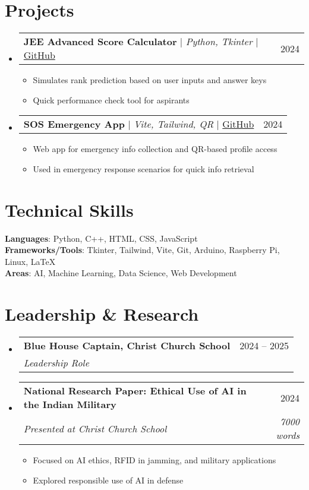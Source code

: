 \documentclass[letterpaper,11pt]{article}
\makeatletter
\newcommand{\resumeItem}[1]{
  \item\small{
    {#1 \vspace{-2pt}}
  }
}
\newcommand{\resumeSubheading}[4]{
  \vspace{-2pt}\item
    \begin{tabular*}{0.97\textwidth}[t]{l@{\extracolsep{\fill}}r}
      \textbf{#1} & #2 \\
      \textit{\small#3} & \textit{\small #4} \\
    \end{tabular*}\vspace{-7pt}
}
\newcommand{\resumeProjectHeading}[2]{
    \item
    \begin{tabular*}{0.97\textwidth}{l@{\extracolsep{\fill}}r}
      \small#1 & #2 \\
    \end{tabular*}\vspace{-7pt}
}
\newcommand{\resumeSubHeadingListStart}{\begin{itemize}[leftmargin=0.15in, label={}]}
\newcommand{\resumeSubHeadingListEnd}{\end{itemize}}
\newcommand{\resumeItemListStart}{\begin{itemize}}
\newcommand{\resumeItemListEnd}{\end{itemize}\vspace{-5pt}}
\makeatother
\begin{document}
\section{Projects}
    \resumeSubHeadingListStart
      \resumeProjectHeading
          {\textbf{JEE Advanced Score Calculator} $|$ \emph{Python, Tkinter} $|$ \href{https://github.com/Prabhav1437/JEE-ADV-Score-Calculator}{GitHub}}{2024}
          \resumeItemListStart
            \resumeItem{Simulates rank prediction based on user inputs and answer keys}
            \resumeItem{Quick performance check tool for aspirants}
          \resumeItemListEnd
      \resumeProjectHeading
          {\textbf{SOS Emergency App} $|$ \emph{Vite, Tailwind, QR} $|$ \href{https://github.com/Prabhav1437/sos-app}{GitHub}}{2024}
          \resumeItemListStart
            \resumeItem{Web app for emergency info collection and QR-based profile access}
            \resumeItem{Used in emergency response scenarios for quick info retrieval}
          \resumeItemListEnd
    \resumeSubHeadingListEnd

\section{Technical Skills}
 \begin{itemize}[leftmargin=0.15in, label={}]
    \small{\item{
     \textbf{Languages}{: Python, C++, HTML, CSS, JavaScript} \\
     \textbf{Frameworks/Tools}{: Tkinter, Tailwind, Vite, Git, Arduino, Raspberry Pi, Linux, LaTeX} \\
     \textbf{Areas}{: AI, Machine Learning, Data Science, Web Development}
    }}
 \end{itemize}

\section{Leadership \& Research}
  \resumeSubHeadingListStart
    \resumeSubheading
      {Blue House Captain, Christ Church School}{2024 -- 2025}
      {Leadership Role}{}
    \resumeSubheading
      {National Research Paper: Ethical Use of AI in the Indian Military}{2024}
      {Presented at Christ Church School}{~7000 words}
      \resumeItemListStart
        \resumeItem{Focused on AI ethics, RFID in jamming, and military applications}
        \resumeItem{Explored responsible use of AI in defense}
      \resumeItemListEnd
  \resumeSubHeadingListEnd
\end{document}
